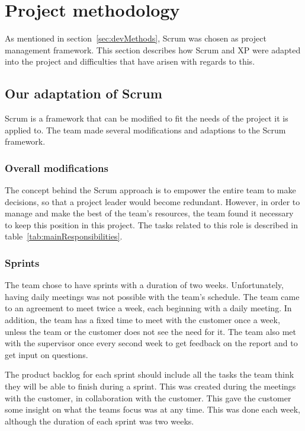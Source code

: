 \newpage
\section{Project methodology}
\label{sec:scrumDevProcess}

As mentioned in section~\ref{sec:devMethods}, Scrum was chosen as project management framework. This section describes how Scrum and XP were adapted into the project and difficulties that have arisen with regards to this.

\subsection{Our adaptation of Scrum}
Scrum is a framework that can be modified to fit the needs of the project it is applied to. The team made several modifications and adaptions to the Scrum framework. 

\subsubsection{Overall modifications}
The concept behind the Scrum approach is to empower the entire team to make decisions, so that a project leader would become redundant. However, in order to manage and make the best of the team's resources, the team found it necessary to keep this position in this project. The tasks related to this role is described in table~\ref{tab:mainResponsibilities}.

\subsubsection{Sprints}
The team chose to have sprints with a duration of two weeks. Unfortunately, having daily meetings was not possible with the team's schedule. The team came to an agreement to meet twice a week, each beginning with a daily meeting. In addition, the team has a fixed time to meet with the customer once a week, unless the team or the customer does not see the need for it. The team also met with the supervisor once every second week to get feedback on the report and to get input on questions.

The product backlog for each sprint should include all the tasks the team think they will be able to finish during a sprint. This was created during the meetings with the customer, in collaboration with the customer. This gave the customer some insight on what the teams focus was at any time. This was done each week, although the duration of each sprint was two weeks.

